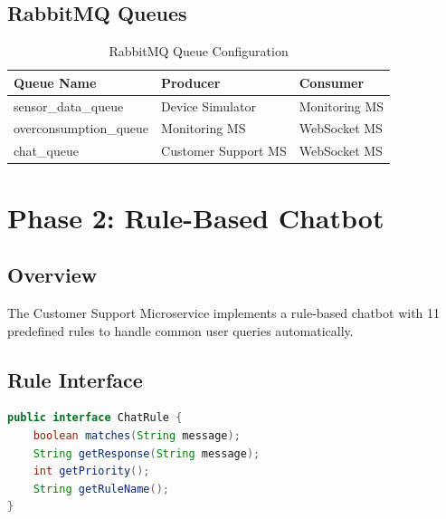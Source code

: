 \documentclass[12pt,a4paper]{article}
\begin{document}
\subsection{RabbitMQ Queues}
\begin{table}[H]
\centering
\begin{tabular}{|l|l|l|}
\hline
\textbf{Queue Name} & \textbf{Producer} & \textbf{Consumer} \\
\hline
sensor\_data\_queue & Device Simulator & Monitoring MS \\
overconsumption\_queue & Monitoring MS & WebSocket MS \\
chat\_queue & Customer Support MS & WebSocket MS \\
\hline
\end{tabular}
\caption{RabbitMQ Queue Configuration}
\end{table}

\section{Phase 2: Rule-Based Chatbot}

\subsection{Overview}
The Customer Support Microservice implements a rule-based chatbot with 11 predefined rules to handle common user queries automatically.

\subsection{Rule Interface}
\begin{lstlisting}[language=Java, caption=ChatRule Interface]
public interface ChatRule {
    boolean matches(String message);
    String getResponse(String message);
    int getPriority();
    String getRuleName();
}
\end{lstlisting}
\end{document}
